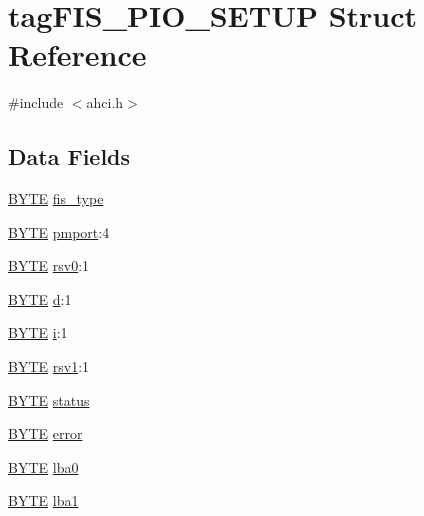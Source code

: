 \hypertarget{structtagFIS__PIO__SETUP}{}\section{tag\+F\+I\+S\+\_\+\+P\+I\+O\+\_\+\+S\+E\+T\+UP Struct Reference}
\label{structtagFIS__PIO__SETUP}


{\ttfamily \#include $<$ahci.\+h$>$}

\subsection*{Data Fields}
\begin{DoxyCompactItemize}
\item 
\hyperlink{ahci_8h_aae9749d96e15ccb4f482dd5f55d98f9b}{B\+Y\+TE} \hyperlink{structtagFIS__PIO__SETUP_a758a3316b371392b16ae8a1767a235dc}{fis\+\_\+type}
\item 
\hyperlink{ahci_8h_aae9749d96e15ccb4f482dd5f55d98f9b}{B\+Y\+TE} \hyperlink{structtagFIS__PIO__SETUP_a6bc2b3383c071ed41aa81e96b9a95c41}{pmport}\+:4
\item 
\hyperlink{ahci_8h_aae9749d96e15ccb4f482dd5f55d98f9b}{B\+Y\+TE} \hyperlink{structtagFIS__PIO__SETUP_a10114bf94890dcaa3ae125478d6461eb}{rsv0}\+:1
\item 
\hyperlink{ahci_8h_aae9749d96e15ccb4f482dd5f55d98f9b}{B\+Y\+TE} \hyperlink{structtagFIS__PIO__SETUP_a7594c820614cf7797657ad47af083bb0}{d}\+:1
\item 
\hyperlink{ahci_8h_aae9749d96e15ccb4f482dd5f55d98f9b}{B\+Y\+TE} \hyperlink{structtagFIS__PIO__SETUP_af95e93614bfb38275e48c37c8120bd63}{i}\+:1
\item 
\hyperlink{ahci_8h_aae9749d96e15ccb4f482dd5f55d98f9b}{B\+Y\+TE} \hyperlink{structtagFIS__PIO__SETUP_ac4c6961c1e6546c49776663efbaacdf5}{rsv1}\+:1
\item 
\hyperlink{ahci_8h_aae9749d96e15ccb4f482dd5f55d98f9b}{B\+Y\+TE} \hyperlink{structtagFIS__PIO__SETUP_a849b51a7cd5e39d2486824189b6327b8}{status}
\item 
\hyperlink{ahci_8h_aae9749d96e15ccb4f482dd5f55d98f9b}{B\+Y\+TE} \hyperlink{structtagFIS__PIO__SETUP_abc098a25cd5e4e719a28ccd9f5d3683b}{error}
\item 
\hyperlink{ahci_8h_aae9749d96e15ccb4f482dd5f55d98f9b}{B\+Y\+TE} \hyperlink{structtagFIS__PIO__SETUP_a5208b17014eb1f6283e37475daa690c1}{lba0}
\item 
\hyperlink{ahci_8h_aae9749d96e15ccb4f482dd5f55d98f9b}{B\+Y\+TE} \hyperlink{structtagFIS__PIO__SETUP_ac6e6aa1cfd46dbaf8ea749d2bfaa8957}{lba1}

\end{DoxyCompactItemize}
